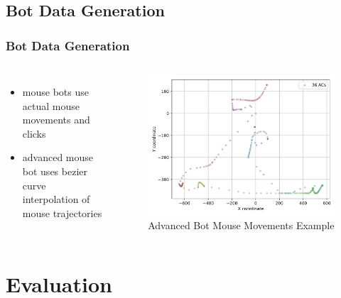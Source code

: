 \documentclass[t,aspectratio=169,table]{beamer}
\begin{document}
\subsection{Bot Data Generation}
\begin{frame}
\frametitle{Bot Data Generation}

\begin{columns}
\begin{itemize}
    \item mouse bots use actual mouse movements and clicks
    \item advanced mouse bot uses bezier curve interpolation of mouse trajectories
\end{itemize}


\begin{figure}[h]
    \includegraphics[width=\textwidth]{figures/bot_mouse_heatmap.png}
    \caption{Advanced Bot Mouse Movements Example}
    \label{fig:bot_mouse_heatmap}
\end{figure}
\end{columns}
\end{frame}

\section{Evaluation}
\end{document}
